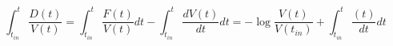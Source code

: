\begin{equation}
\int_{t_{in}}^t \frac{D(t)}{V(t)}=\int_{t_{in}}^t \frac{F(t)}{V(t)} dt - \int_{t_{in}}^t \frac{dV(t)}{dt} dt = -\log \frac{V(t)}{V(t_{in})}+ \int_{t_{in}}^t \frac{(t)}{dt} dt
\end{equation}